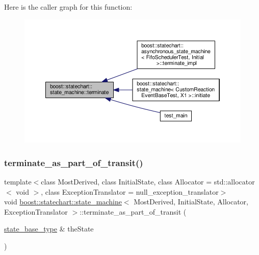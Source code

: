 Here is the caller graph for this function\+:
\nopagebreak
\begin{figure}[H]
\begin{center}
\leavevmode
\includegraphics[width=350pt]{classboost_1_1statechart_1_1state__machine_a6abd7c38c09f87fa662c5aa5e8f6f3ff_icgraph}
\end{center}
\end{figure}
\mbox{\label{classboost_1_1statechart_1_1state__machine_ad67f22f0ca7a18cada1420b9d851530c}} 
\subsubsection{\texorpdfstring{terminate\+\_\+as\+\_\+part\+\_\+of\+\_\+transit()}{terminate\_as\_part\_of\_transit()}\hspace{0.1cm}{\footnotesize\ttfamily [1/2]}}
{\footnotesize\ttfamily template$<$class Most\+Derived, class Initial\+State, class Allocator = std\+::allocator$<$ void $>$, class Exception\+Translator = null\+\_\+exception\+\_\+translator$>$ \\
void \mbox{\hyperlink{classboost_1_1statechart_1_1state__machine}{boost\+::statechart\+::state\+\_\+machine}}$<$ Most\+Derived, Initial\+State, Allocator, Exception\+Translator $>$\+::terminate\+\_\+as\+\_\+part\+\_\+of\+\_\+transit (\begin{DoxyParamCaption}\item[{\mbox{\hyperlink{classboost_1_1statechart_1_1state__machine_a69cc258c29fcabec25c5dc8bedb7d530}{state\+\_\+base\+\_\+type}} \&}]{the\+State }\end{DoxyParamCaption})\hspace{0.3cm}{\ttfamily [inline]}}

